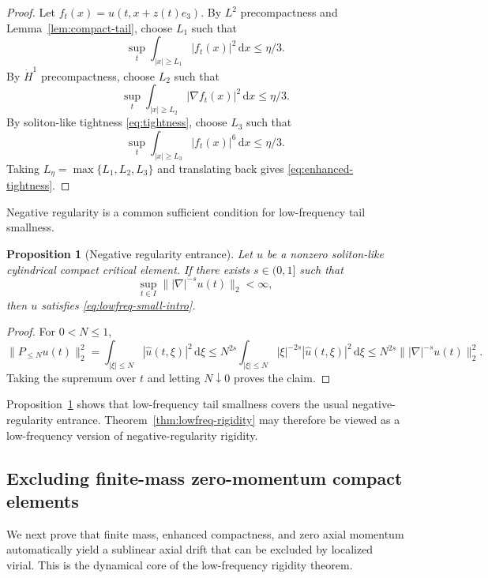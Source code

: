\documentclass[preprint,12pt]{elsarticle}
\numberwithin{equation}{section}
\newcommand{\dd}{\,\mathrm d}
\newcommand{\na}{\nabla}
\newcommand{\ez}{e_3}
\newtheorem{proposition}[theorem]{Proposition}
\theoremstyle{remark}
\begin{document}
\begin{proof}
Let $f_t(x)=u(t,x+z(t)\ez)$.  By $L^2$ precompactness and Lemma~\ref{lem:compact-tail}, choose $L_1$ such that
\[
  \sup_t\int_{|x|\ge L_1}|f_t(x)|^2\dd x\le \eta/3.
\]
By $\dot H^1$ precompactness, choose $L_2$ such that
\[
  \sup_t\int_{|x|\ge L_2}|\na f_t(x)|^2\dd x\le \eta/3.
\]
By soliton-like tightness \eqref{eq:tightness}, choose $L_3$ such that
\[
  \sup_t\int_{|x|\ge L_3}|f_t(x)|^6\dd x\le \eta/3.
\]
Taking $L_\eta=\max\{L_1,L_2,L_3\}$ and translating back gives \eqref{eq:enhanced-tightness}.
\end{proof}

Negative regularity is a common sufficient condition for low-frequency tail smallness.

\begin{proposition}[Negative regularity entrance]\label{prop:negative-regularity}
Let $u$ be a nonzero soliton-like cylindrical compact critical element.  If there exists $s\in(0,1]$ such that
\[
  \sup_{t\in I}\||\na|^{-s}u(t)\|_2<\infty,
\]
then $u$ satisfies \eqref{eq:lowfreq-small-intro}.
\end{proposition}

\begin{proof}
For $0<N\le1$,
\[
  \|P_{\le N}u(t)\|_2^2
  =\int_{|\xi|\le N}|\widehat u(t,\xi)|^2\dd\xi
  \le N^{2s}\int_{|\xi|\le N}|\xi|^{-2s}|\widehat u(t,\xi)|^2\dd\xi
  \le N^{2s}\||\na|^{-s}u(t)\|_2^2.
\]
Taking the supremum over $t$ and letting $N\downarrow0$ proves the claim.
\end{proof}

Proposition~\ref{prop:negative-regularity} shows that low-frequency tail smallness covers the usual negative-regularity entrance.  Theorem~\ref{thm:lowfreq-rigidity} may therefore be viewed as a low-frequency version of negative-regularity rigidity.

\subsection{Excluding finite-mass zero-momentum compact elements}

We next prove that finite mass, enhanced compactness, and zero axial momentum automatically yield a sublinear axial drift that can be excluded by localized virial.  This is the dynamical core of the low-frequency rigidity theorem.
\end{document}
